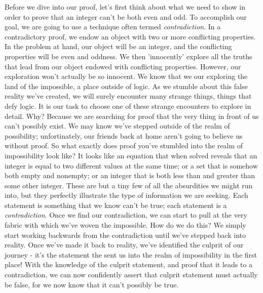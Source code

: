 \documentclass[a4paper,12pt]{article}
\begin{document}
Before we dive into our proof, let's first think about what we need to show in order to prove that an integer can't be both even and odd. To accomplish our goal, we are going to use a technique often termed \textit{contradiction}. In a contradictory proof, we endow an object with two or more conflicting properties. In the problem at hand, our object will be an integer, and the conflicting properties will be even and oddness. We then 'innocently' explore all the truths that lead from our object endowed with conflicting properties. However, our exploration won't actually be so innocent. We know that we our exploring the land of the impossible, a place outside of logic. As we stumble about this false reality we've created, we will surely encounter many strange things, things that defy logic. It is our task to choose one of these strange encounters to explore in detail. Why? Because we are searching for proof that the very thing in front of us can't possibly exist. We may know we've stepped outside of the realm of possibility; unfortinately, our friends back at home aren't going to believe us without proof. So what exactly does proof you've stumbled into the realm of impossibility look like? It looks like an equation that when solved reveals that an integer is equal to two different values at the same time; or a set that is somehow both empty and nonempty; or an integer that is both less than and greater than some other integer. These are but a tiny few of all the absurdities we might run into, but they perfectly illustrate the type of information we are seeking. Each statement is something that we know can't be true; each statement is a \textit{contradiction}. Once we find our contradiction, we can start to pull at the very fabric with which we've woven the impossible. How do we do this? We simply start working backwards from the contradiction until we've stepped back into reality. Once we've made it back to reality, we've identified the culprit of our journey - it's the statement the sent us into the realm of impossibility in the first place! With the knowledge of the culprit statement, and proof that it leads to a contradiction, we can now confidently assert that culprit statement must actually be false, for we now know that it can't possibly be true. 
\end{document}
